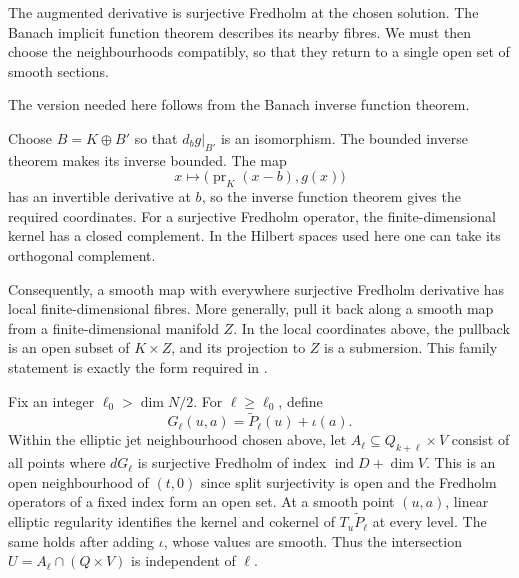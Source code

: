 The augmented derivative is surjective Fredholm at the chosen solution.
The Banach implicit function theorem describes its nearby fibres.
We must then choose the neighbourhoods compatibly, so that they return
to a single open set of smooth sections.

The version needed here follows from the Banach inverse function theorem.


Choose $B=K\oplus B'$ so that $d_bg|_{B'}$ is an isomorphism.
The bounded inverse theorem makes its inverse bounded.
The map
\[
 x\longmapsto\bigl(\operatorname{pr}_K(x-b),g(x)\bigr)
\]
has an invertible derivative at $b$, so the inverse function theorem
gives the required coordinates.
For a surjective Fredholm operator, the finite-dimensional kernel has
a closed complement. In the Hilbert spaces used here one can take
its orthogonal complement.

Consequently, a smooth map with everywhere surjective Fredholm
derivative has local finite-dimensional fibres.
More generally, pull it back along a smooth map from a finite-dimensional
manifold $Z$. In the local coordinates above, the pullback is an open
subset of $K\times Z$, and its projection to $Z$ is a submersion.
This family statement is exactly the form required in .

Fix an integer $\ell_0>\dim N/2$. For $\ell\geq\ell_0$, define
\[
 G_\ell(u,a)=\widetilde P_\ell(u)+\iota(a).
\]
Within the elliptic jet neighbourhood chosen above, let
$A_\ell\subseteq Q_{k+\ell}\times V$ consist of all points where
$dG_\ell$ is surjective Fredholm of index $\operatorname{ind}D+\dim V$.
This is an open neighbourhood of $(t,0)$ since split surjectivity is
open and the Fredholm operators of a fixed index form an open set.
At a smooth point $(u,a)$, linear elliptic regularity identifies the
kernel and cokernel of $T_u\widetilde P_\ell$ at every level.
The same holds after adding $\iota$, whose values are smooth.
Thus the intersection $U=A_\ell\cap(Q\times V)$ is independent of $\ell$.

